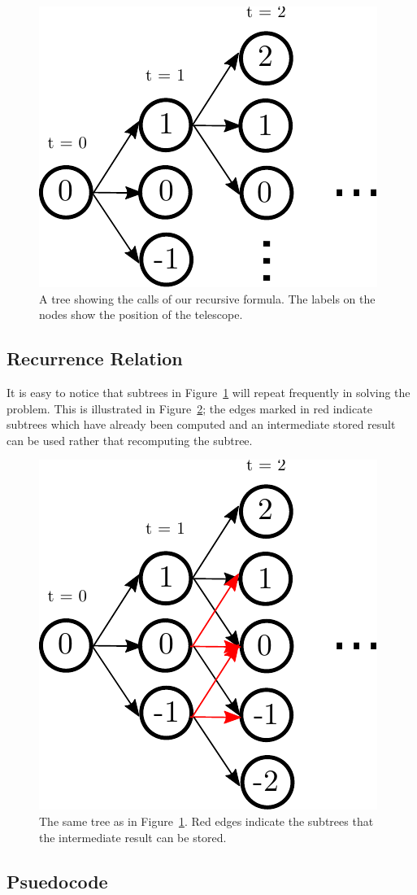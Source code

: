 \documentclass[titlepage,12pt]{article}
\begin{document}
\begin{figure}[H]
    \begin{center}
    \includegraphics[width=0.4\linewidth]{dp_recursive}
    \end{center}
    \caption{A tree showing the calls of our recursive formula. The
    labels on the nodes show the position of the telescope.}
    \label{fig:recursive}
\end{figure}

\subsection{Recurrence Relation}

It is easy to notice that subtrees in Figure~\ref{fig:recursive} will repeat
frequently in solving the problem. This is illustrated in Figure~\ref{fig:red};
the edges marked in red indicate subtrees which have already been computed and
an intermediate stored result can be used rather that recomputing the subtree.

\begin{figure}[H]
    \begin{center}
    \includegraphics[width=0.4\linewidth]{dp_red}
    \end{center}
    \caption{The same tree as in Figure~\ref{fig:recursive}. Red edges indicate the
    subtrees that the intermediate result can be stored.}
    \label{fig:red}
\end{figure}

\subsection{Psuedocode}
\end{document}
